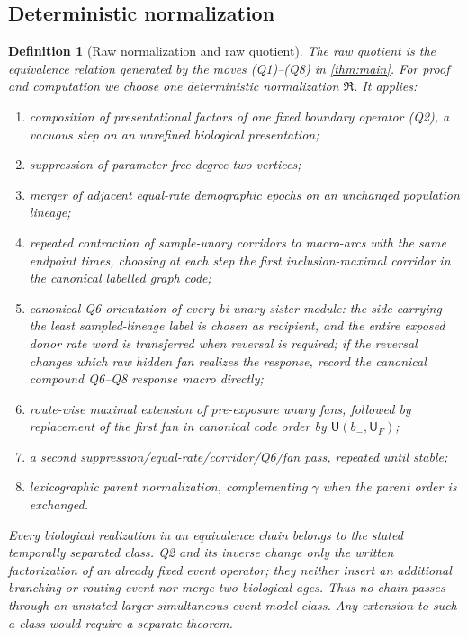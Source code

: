 \documentclass[11pt]{article}
\newtheorem{definition}[theorem]{Definition}
\newcommand{\Rraw}{\mathfrak R}
\begin{document}
\subsection{Deterministic normalization}
\begin{definition}[Raw normalization and raw quotient]
\label{def:normalization}
The raw quotient is the equivalence relation generated by the moves (Q1)--(Q8) in \cref{thm:main}.  For proof and computation we choose one deterministic normalization $\Rraw$.  It applies:
\begin{enumerate}
\item composition of presentational factors of one fixed boundary operator (Q2), a vacuous step on an unrefined biological presentation;
\item suppression of parameter-free degree-two vertices;
\item merger of adjacent equal-rate demographic epochs on an unchanged population lineage;
\item repeated contraction of sample-unary corridors to macro-arcs with the same endpoint times, choosing at each step the first inclusion-maximal corridor in the canonical labelled graph code;
\item canonical Q6 orientation of every bi-unary sister module: the side
carrying the least sampled-lineage label is chosen as recipient, and the
entire exposed donor rate word is transferred when reversal is required; if
the reversal changes which raw hidden fan realizes the response, record the
canonical compound Q6--Q8 response macro directly;
\item route-wise maximal extension of pre-exposure unary fans, followed by replacement of the first fan in canonical code order by $\mathsf U(b_-,\mathsf U_F)$;
\item a second suppression/equal-rate/corridor/Q6/fan pass, repeated until stable;
\item lexicographic parent normalization, complementing $\gamma$ when the parent order is exchanged.
\end{enumerate}
Every biological realization in an equivalence chain belongs to the stated temporally separated class. Q2 and its inverse change only the written factorization of an already fixed event operator; they neither insert an additional branching or routing event nor merge two biological ages. Thus no chain passes through an unstated larger simultaneous-event model class. Any extension to such a class would require a separate theorem.
\end{definition}
\end{document}
